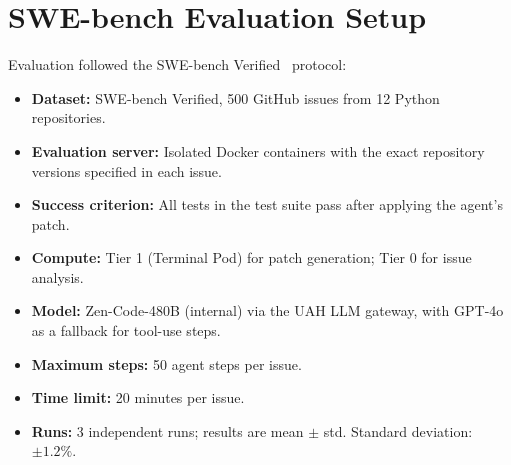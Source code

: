 \section{SWE-bench Evaluation Setup}

\label{app:swebench-setup}

Evaluation followed the SWE-bench Verified~\cite{jimenez2024swebench}
protocol:
\begin{itemize}[leftmargin=1.5em]
    \item \textbf{Dataset:} SWE-bench Verified, 500 GitHub issues from 12
          Python repositories.
    \item \textbf{Evaluation server:} Isolated Docker containers with the
          exact repository versions specified in each issue.
    \item \textbf{Success criterion:} All tests in the test suite pass after
          applying the agent's patch.
    \item \textbf{Compute:} Tier 1 (Terminal Pod) for patch generation;
          Tier 0 for issue analysis.
    \item \textbf{Model:} Zen-Code-480B (internal) via the UAH LLM gateway,
          with GPT-4o as a fallback for tool-use steps.
    \item \textbf{Maximum steps:} 50 agent steps per issue.
    \item \textbf{Time limit:} 20 minutes per issue.
    \item \textbf{Runs:} 3 independent runs; results are mean $\pm$ std.
          Standard deviation: $\pm 1.2\%$.
\end{itemize}

